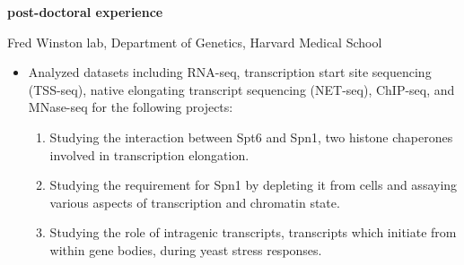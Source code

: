 \documentclass[11pt, a4paper]{article}
\begin{document}
\vspace{1em}
\textbf{\Large post-doctoral experience}

\begin{description}[topsep=2pt, align=right, leftmargin=!, labelwidth=\widthof{\textbf{2019}}]
    \item [2020] Fred Winston lab, Department of Genetics, Harvard Medical School
        \begin{itemize}[topsep=0pt, align=right, leftmargin=!, font=\normalfont]
            \item Analyzed datasets including RNA-seq, transcription start site sequencing (TSS-seq), native elongating transcript sequencing (NET-seq), ChIP-seq, and MNase-seq for the following projects:
                \begin{enumerate}
                    \item Studying the interaction between Spt6 and Spn1, two histone chaperones involved in transcription elongation.
                    \item Studying the requirement for Spn1 by depleting it from cells and assaying various aspects of transcription and chromatin state.
                    \item Studying the role of intragenic transcripts, transcripts which initiate from within gene bodies, during yeast stress responses.
                \end{enumerate}
        \end{itemize}
\end{description}
\end{document}
